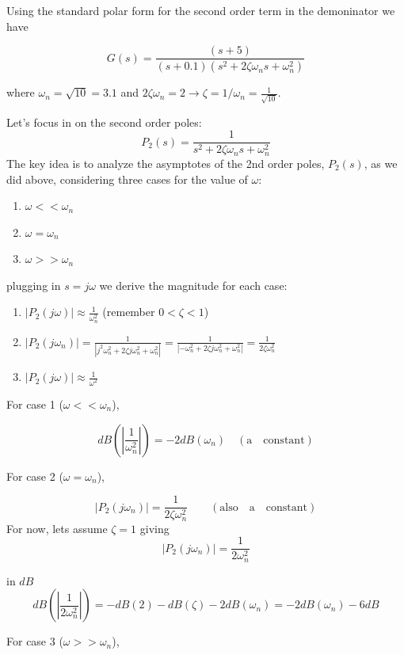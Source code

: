 Using the standard polar form for the second order term in the demoninator we have

\[
G(s) = \frac  {(s+5)}  {(s+0.1) (s^2 + 2\zeta\omega_n s + \omega_n^2)}
\]

where $\omega_n = \sqrt{10} = 3.1$ and $2\zeta\omega_n = 2 \to \zeta = 1/\omega_n = \frac{1}{\sqrt{10}} $.

Let's focus in on the second order poles:
\[
P_2(s) =   \frac {1}{s^2 + 2\zeta\omega_n s + \omega_n^2 }
\]
The key idea is to analyze the asymptotes of the 2nd order poles, $P_2(s)$, as we did above,  considering three
cases for the value of $\omega$:

\begin{enumerate}
  \item $\omega << \omega_n$
  \item $\omega =  \omega_n$
  \item $\omega >> \omega_n$
\end{enumerate}

plugging in $s=j\omega$  we derive the magnitude for each case:

\begin{enumerate}
  \item $|P_2(j\omega)| \approx \frac {1}{\omega_n^2}$ (remember $0< \zeta < 1$)


  \item $|P_2(j\omega_n)| = \frac  {1}{|j^2\omega_n^2 + 2\zeta j \omega_n^2 + \omega_n^2|}  =
                               \frac{1}{|-\omega_n^2 + 2\zeta j \omega_n^2 + \omega_n^2|} =
                               \frac{1}{2\zeta \omega_n^2}$

  \item $|P_2(j\omega)| \approx \frac {1}{\omega^2}$
\end{enumerate}

For case 1 ($\omega << \omega_n$),

\[
dB(|\frac{1}{\omega_n^2}|) = -2dB(\omega_n) \quad \mathrm{(a\quad constant)}
\]

For case 2 ($\omega =  \omega_n$),

\[
|P_2(j\omega_n)| =  \frac {1}  {2\zeta \omega_n^2} \qquad \mathrm{(also\quad a\quad constant)}
\]
For now, lets assume $\zeta=1$ giving
\[
|P_2(j\omega_n)| =  \frac {1}  {2\omega_n^2}
\]

in $dB$
\[
dB(| \frac {1}  {2 \omega_n^2} |) =  -dB(2) -dB(\zeta) -2dB(\omega_n) = -2dB(\omega_n)-6dB
\]

For case 3 ($\omega >>  \omega_n$),

